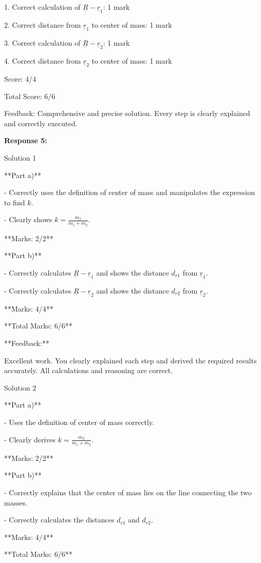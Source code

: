 \documentclass[a4paper,11pt]{article}
\begin{document}
1. Correct calculation of \(\underline{R} - \underline{r}_1\): 1 mark

2. Correct distance from \(\underline{r}_1\) to center of mass: 1 mark

3. Correct calculation of \(\underline{R} - \underline{r}_2\): 1 mark

4. Correct distance from \(\underline{r}_2\) to center of mass: 1 mark

Score: 4/4

Total Score: 6/6

Feedback: Comprehensive and precise solution. Every step is clearly explained and correctly executed.

\bigskip
\textbf{Response 5:}

Solution 1

**Part a)**

- Correctly uses the definition of center of mass and manipulates the expression to find \( k \).

- Clearly shows \( k = \frac{m_2}{m_1 + m_2} \).

**Marks: 2/2**

**Part b)**

- Correctly calculates \( \underline{R} - \underline{r}_1 \) and shows the distance \( d_{r1} \) from \( \underline{r}_1 \).

- Correctly calculates \( \underline{R} - \underline{r}_2 \) and shows the distance \( d_{r2} \) from \( \underline{r}_2 \).

**Marks: 4/4**

**Total Marks: 6/6**

**Feedback:**

Excellent work. You clearly explained each step and derived the required results accurately. All calculations and reasoning are correct.

Solution 2

**Part a)**

- Uses the definition of center of mass correctly.

- Clearly derives \( k = \frac{m_2}{m_1 + m_2} \).

**Marks: 2/2**

**Part b)**

- Correctly explains that the center of mass lies on the line connecting the two masses.

- Correctly calculates the distances \( d_{r1} \) and \( d_{r2} \).

**Marks: 4/4**

**Total Marks: 6/6**
\end{document}
